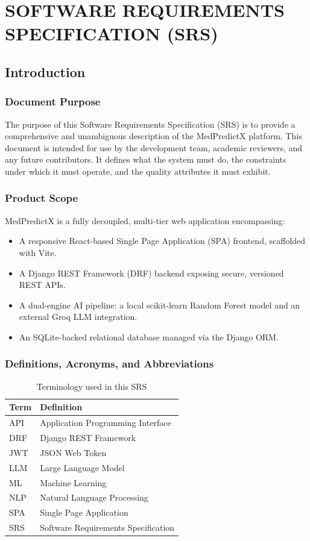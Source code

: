 \chapter{SOFTWARE REQUIREMENTS SPECIFICATION (SRS)}

\section{Introduction}

\subsection{Document Purpose}
The purpose of this Software Requirements Specification (SRS) is to provide a comprehensive and unambiguous description of the MedPredictX platform. This document is intended for use by the development team, academic reviewers, and any future contributors. It defines what the system must do, the constraints under which it must operate, and the quality attributes it must exhibit.

\subsection{Product Scope}
MedPredictX is a fully decoupled, multi-tier web application encompassing:
\begin{itemize}
    \item A responsive React-based Single Page Application (SPA) frontend, scaffolded with Vite.
    \item A Django REST Framework (DRF) backend exposing secure, versioned REST APIs.
    \item A dual-engine AI pipeline: a local scikit-learn Random Forest model and an external Groq LLM integration.
    \item An SQLite-backed relational database managed via the Django ORM.
\end{itemize}

\subsection{Definitions, Acronyms, and Abbreviations}
\begin{table}[htbp]
\centering
\caption{Terminology used in this SRS}
\begin{tabular}{|l|l|}
\hline
\textbf{Term} & \textbf{Definition} \\
\hline
API & Application Programming Interface \\
DRF & Django REST Framework \\
JWT & JSON Web Token \\
LLM & Large Language Model \\
ML & Machine Learning \\
NLP & Natural Language Processing \\
SPA & Single Page Application \\
SRS & Software Requirements Specification \\
\hline
\end{tabular}
\end{table}

